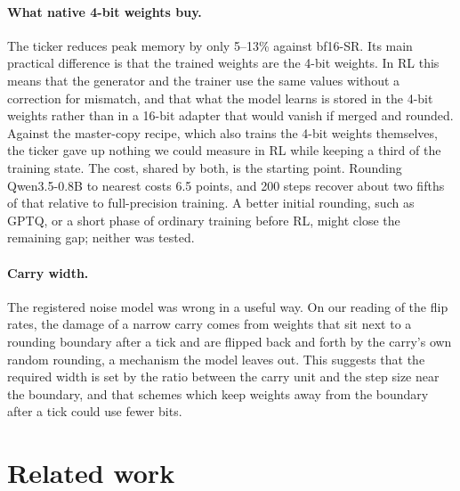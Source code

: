 \documentclass[11pt]{article}
\begin{document}
\paragraph{What native 4-bit weights buy.} The ticker reduces peak memory by only 5--13\% against bf16-SR. Its main
practical difference is that the trained weights are the 4-bit weights. In RL this means that the
generator and the trainer use the same values without a correction for mismatch, and that what the model learns is
stored in the 4-bit weights rather than in a 16-bit adapter that would vanish if merged and rounded. Against the
master-copy recipe, which also trains the 4-bit weights themselves, the ticker gave up nothing we could measure in RL
while keeping a third of the training state. The cost, shared by both, is the starting point. Rounding Qwen3.5-0.8B to nearest costs 6.5 points, and 200 steps recover about two fifths of that
relative to full-precision training. A better initial rounding, such as GPTQ, or a short phase of ordinary training
before RL, might close the remaining gap; neither was tested.

\paragraph{Carry width.} The registered noise model was wrong in a useful way. On our reading of the flip rates, the
damage of a narrow carry comes from weights that sit next to a rounding boundary after a tick and are flipped back
and forth by the carry's own random rounding, a mechanism the model leaves out. This suggests that the
required width is set by the ratio between the carry unit and the step size near the boundary, and that schemes which
keep weights away from the boundary after a tick could use fewer bits.

\section{Related work}\label{sec:related}
\end{document}
